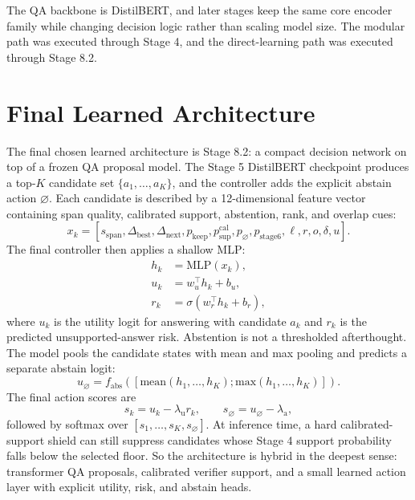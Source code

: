 \documentclass[10pt,twocolumn]{article}
\begin{document}
The QA backbone is DistilBERT, and later stages keep the same core encoder
family while changing decision logic rather than scaling model size.
The modular path was executed through Stage 4, and the direct-learning path was
executed through Stage 8.2.

\section{Final Learned Architecture}
The final chosen learned architecture is Stage 8.2: a compact decision network
on top of a frozen QA proposal model.
The Stage 5 DistilBERT checkpoint produces a top-\(K\) candidate set
\(\{a_1,\dots,a_K\}\), and the controller adds the explicit abstain action
\(\varnothing\).
Each candidate is described by a 12-dimensional feature vector containing span
quality, calibrated support, abstention, rank, and overlap cues:
\begin{equation}
  x_k =
  [s_{\mathrm{span}}, \Delta_{\mathrm{best}}, \Delta_{\mathrm{next}},
   p_{\mathrm{keep}}, p_{\mathrm{sup}}^{\mathrm{cal}},
   p_{\varnothing}, p_{\mathrm{stage6}}, \ell, r, o, \delta, u].
\end{equation}
The final controller then applies a shallow MLP:
\begin{align}
  h_k &= \mathrm{MLP}(x_k), \\
  u_k &= w_u^\top h_k + b_u, \\
  r_k &= \sigma(w_r^\top h_k + b_r),
\end{align}
where \(u_k\) is the utility logit for answering with candidate \(a_k\) and
\(r_k\) is the predicted unsupported-answer risk.
Abstention is not a thresholded afterthought.
The model pools the candidate states with mean and max pooling and predicts a
separate abstain logit:
\begin{equation}
  u_{\varnothing}
  =
  f_{\mathrm{abs}}([\mathrm{mean}(h_1,\dots,h_K);
  \mathrm{max}(h_1,\dots,h_K)]).
\end{equation}
The final action scores are
\begin{equation}
  s_k = u_k - \lambda_{\mathrm{u}} r_k,
  \qquad
  s_{\varnothing} = u_{\varnothing} - \lambda_{\mathrm{a}},
\end{equation}
followed by softmax over
\([s_1,\dots,s_K,s_{\varnothing}]\).
At inference time, a hard calibrated-support shield can still suppress
candidates whose Stage 4 support probability falls below the selected floor.
So the architecture is hybrid in the deepest sense:
transformer QA proposals, calibrated verifier support, and a small learned
action layer with explicit utility, risk, and abstain heads.
\end{document}
